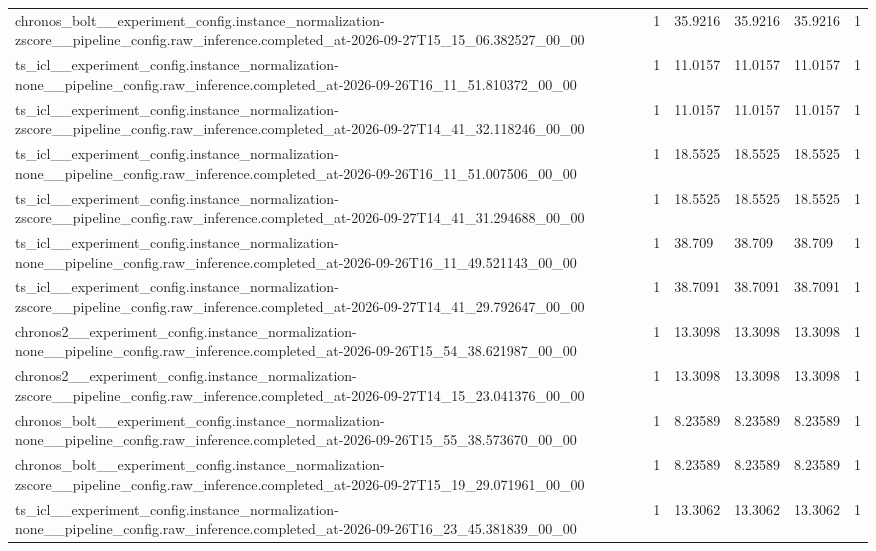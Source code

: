 \begin{tabular}{llllll}
chronos\_bolt\_\_experiment\_config.instance\_normalization-zscore\_\_pipeline\_config.raw\_inference.completed\_at-2026-09-27T15\_15\_06.382527\_00\_00 & 1 & 35.9216 & 35.9216 & 35.9216 & 1 \\
ts\_icl\_\_experiment\_config.instance\_normalization-none\_\_pipeline\_config.raw\_inference.completed\_at-2026-09-26T16\_11\_51.810372\_00\_00 & 1 & 11.0157 & 11.0157 & 11.0157 & 1 \\
ts\_icl\_\_experiment\_config.instance\_normalization-zscore\_\_pipeline\_config.raw\_inference.completed\_at-2026-09-27T14\_41\_32.118246\_00\_00 & 1 & 11.0157 & 11.0157 & 11.0157 & 1 \\
ts\_icl\_\_experiment\_config.instance\_normalization-none\_\_pipeline\_config.raw\_inference.completed\_at-2026-09-26T16\_11\_51.007506\_00\_00 & 1 & 18.5525 & 18.5525 & 18.5525 & 1 \\
ts\_icl\_\_experiment\_config.instance\_normalization-zscore\_\_pipeline\_config.raw\_inference.completed\_at-2026-09-27T14\_41\_31.294688\_00\_00 & 1 & 18.5525 & 18.5525 & 18.5525 & 1 \\
ts\_icl\_\_experiment\_config.instance\_normalization-none\_\_pipeline\_config.raw\_inference.completed\_at-2026-09-26T16\_11\_49.521143\_00\_00 & 1 & 38.709 & 38.709 & 38.709 & 1 \\
ts\_icl\_\_experiment\_config.instance\_normalization-zscore\_\_pipeline\_config.raw\_inference.completed\_at-2026-09-27T14\_41\_29.792647\_00\_00 & 1 & 38.7091 & 38.7091 & 38.7091 & 1 \\
chronos2\_\_experiment\_config.instance\_normalization-none\_\_pipeline\_config.raw\_inference.completed\_at-2026-09-26T15\_54\_38.621987\_00\_00 & 1 & 13.3098 & 13.3098 & 13.3098 & 1 \\
chronos2\_\_experiment\_config.instance\_normalization-zscore\_\_pipeline\_config.raw\_inference.completed\_at-2026-09-27T14\_15\_23.041376\_00\_00 & 1 & 13.3098 & 13.3098 & 13.3098 & 1 \\
chronos\_bolt\_\_experiment\_config.instance\_normalization-none\_\_pipeline\_config.raw\_inference.completed\_at-2026-09-26T15\_55\_38.573670\_00\_00 & 1 & 8.23589 & 8.23589 & 8.23589 & 1 \\
chronos\_bolt\_\_experiment\_config.instance\_normalization-zscore\_\_pipeline\_config.raw\_inference.completed\_at-2026-09-27T15\_19\_29.071961\_00\_00 & 1 & 8.23589 & 8.23589 & 8.23589 & 1 \\
ts\_icl\_\_experiment\_config.instance\_normalization-none\_\_pipeline\_config.raw\_inference.completed\_at-2026-09-26T16\_23\_45.381839\_00\_00 & 1 & 13.3062 & 13.3062 & 13.3062 & 1 \\

\end{tabular}
